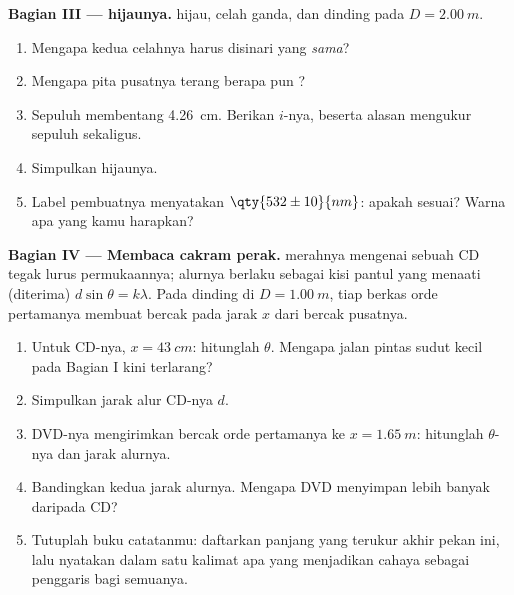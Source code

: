 \begin{problem}
\medskip
\noindent\textbf{Bagian III ---   hijaunya.}
 hijau, celah ganda, dan dinding pada $D = \qty{2.00}{m}$.
\begin{enumerate}[resume]
  \item Mengapa kedua celahnya harus disinari  yang \emph{sama}?
  \item Mengapa pita pusatnya terang berapa pun ?
  \item Sepuluh  membentang \qty{4.26}{cm}. Berikan
        $i$-nya, beserta alasan mengukur sepuluh sekaligus.
  \item Simpulkan   hijaunya.
  \item Label pembuatnya menyatakan $\qty{532 \pm 10}{nm}$: apakah
        sesuai? Warna apa yang kamu harapkan?
\end{enumerate}

\medskip
\noindent\textbf{Bagian IV --- Membaca cakram perak.}  merahnya
mengenai sebuah CD tegak lurus permukaannya; alurnya berlaku sebagai
kisi pantul yang menaati (diterima) $d \sin\theta = k\lambda$. Pada
dinding di $D =
\qty{1.00}{m}$, tiap berkas orde pertamanya membuat
bercak pada jarak $x$ dari bercak pusatnya.
\begin{enumerate}[resume]
  \item Untuk CD-nya, $x = \qty{43}{cm}$: hitunglah $\theta$. Mengapa
        jalan pintas sudut kecil pada Bagian I kini terlarang?
  \item Simpulkan jarak alur CD-nya $d$.
  \item DVD-nya mengirimkan bercak orde pertamanya ke
        $x = \qty{1.65}{m}$: hitunglah $\theta$-nya dan jarak alurnya.
  \item Bandingkan kedua jarak alurnya. Mengapa DVD menyimpan lebih
        banyak daripada CD?
  \item Tutuplah buku catatanmu: daftarkan panjang yang terukur akhir
        pekan ini, lalu nyatakan dalam satu kalimat apa yang menjadikan
        cahaya sebagai penggaris bagi semuanya.
\end{enumerate}
\end{problem}
